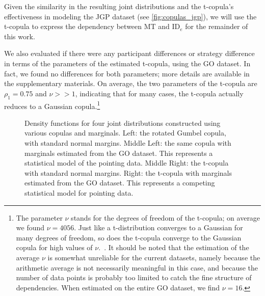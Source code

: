 \documentclass[manuscript,review,anonymous]{acmart}
\newcommand{\ide}{\ensuremath{{\text{ID}_e}}\xspace}
\begin{document}
Given the similarity in the resulting joint distributions and the t-copula's effectiveness in modeling the JGP dataset (see \autoref{fig:copulas_jgp}), we will use the t-copula to express the dependency between MT and \ide for the remainder of this work.

We also evaluated if there were any participant differences or strategy difference in terms of the parameters of the estimated t-copula, using the GO dataset. In fact, we found no differences for both parameters; more details are available in the supplementary materials. On average, the two parameters of the t-copula are $\rho_1 = 0.75$ and $\nu >> 1$, indicating that for many cases, the t-copula actually reduces to a Gaussian copula.\footnote{The parameter $\nu$ stands for the degrees of freedom of the t-copula; on average we found $\nu = 4056$. Just like a t-distribution converges to a Gaussian for many degrees of freedom, so does the t-copula converge to the Gaussian copula for high values of $\nu$.~\cite{demarta2005, nelsen2006}. It should be noted that the estimation of the average $\nu$ is somewhat unreliable for the current datasets, namely because the arithmetic average is not necessarily meaningful in this case, and because the number of data points is probably too limited to catch the fine structure of dependencies. When estimated on the entire GO dataset, we find $\nu = 16$.}




\begin{figure}[htbp]
	\centering
	\caption{Density functions for four joint distributions constructed using various copulas and marginals. Left: the rotated Gumbel copula, with standard normal margins. Middle Left: the same copula with marginals estimated from the GO dataset. This represents a statistical model of the pointing data. Middle Right: the t-copula with standard normal margins. Right: the t-copula with marginals estimated from the GO dataset. This represents a competing statistical model for pointing data.}
	\label{fig:copulas}
\end{figure}
\end{document}

